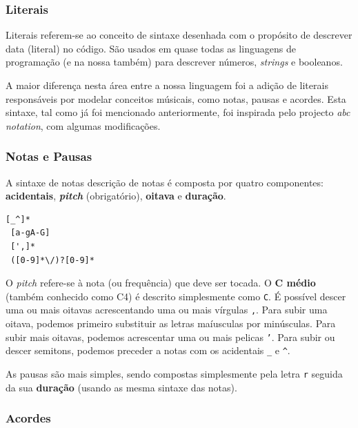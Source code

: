 \documentclass[
  oneside,
  11pt, a4paper,
  footinclude=true,
  headinclude=true,
  cleardoublepage=empty
]{scrbook}
\begin{document}
	\subsubsection{\textbf{Literais}}
	Literais referem-se ao conceito de sintaxe desenhada com o propósito de descrever data (literal) no código. São usados em quase todas as linguagens de programação (e na nossa também) para descrever números, \textit{strings} e booleanos.
	
	A maior diferença nesta área entre a nossa linguagem foi a adição de literais responsáveis por modelar conceitos músicais, como notas, pausas e acordes. Esta sintaxe, tal como já foi mencionado anteriormente, foi inspirada pelo projecto \textit{abc notation}, com algumas modificações.
	
	\subsubsection{\textbf{Notas e Pausas}}
	A sintaxe de notas descrição de notas é composta por quatro componentes: \textbf{acidentais}, \textbf{\textit{pitch}} (obrigatório), \textbf{oitava} e \textbf{duração}.
	
\begin{center}
\begin{lstlisting}[backgroundcolor=\color{transparent},captionpos=b,caption=Expressão regular que identifica uma nota (quebras de linha apenas para claridade de leitura),xleftmargin=.4\textwidth]
 [_^]*
 [a-gA-G]
 [',]*
 ([0-9]*\/)?[0-9]*
\end{lstlisting}
\end{center}
	
	O \textit{pitch} refere-se à nota (ou frequência) que deve ser tocada. O \textbf{C médio} (também conhecido como C4) é descrito simplesmente como \texttt{C}. É possível descer uma ou mais oitavas acrescentando uma ou mais vírgulas \texttt{,}. Para subir uma oitava, podemos primeiro substituir as letras maíusculas por minúsculas. Para subir mais oitavas, podemos acrescentar uma ou mais pelicas \texttt{'}. Para subir ou descer semitons, podemos preceder a notas com os acidentais \texttt{\_} e \texttt{\^}.
	
	As pausas são mais simples, sendo compostas simplesmente pela letra \texttt{r} seguida da sua \textbf{duração} (usando as mesma sintaxe das notas).
	
	\subsubsection{\textbf{Acordes}}
\end{document}
